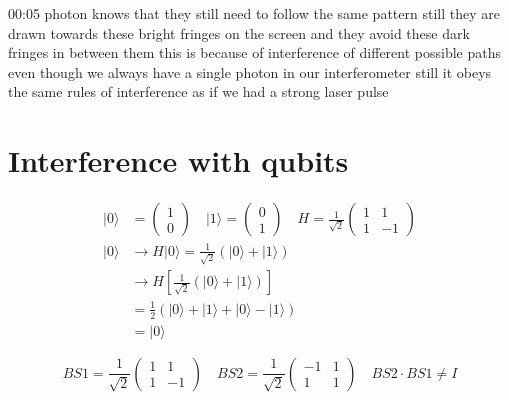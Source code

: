 00:05
photon knows that they still need to follow the same pattern still they are
drawn towards these bright fringes on the screen
and they avoid these dark fringes in between
them this is because of interference of different possible paths
even though we always have a single photon
in our interferometer still it obeys the same
rules of interference as if we had a strong laser pulse

\section{Interference with qubits}

\begin{equation}
\begin{aligned}
|0\rangle &=\left(\begin{array}{l}
1 \\
0
\end{array}\right) \quad|1\rangle=\left(\begin{array}{l}
0 \\
1
\end{array}\right) \quad H=\frac{1}{\sqrt{2}}\left(\begin{array}{cc}
1 & 1 \\
1 & -1
\end{array}\right) \\
|0\rangle & \longrightarrow H|0\rangle=\frac{1}{\sqrt{2}}(|0\rangle+|1\rangle) \\
& \longrightarrow H\left[\frac{1}{\sqrt{2}}(|0\rangle+|1\rangle)\right] \\
&=\frac{1}{2}(|0\rangle+|1\rangle+|0\rangle-|1\rangle) \\
&=|0\rangle
\end{aligned}
\end{equation}

\begin{equation}
B S 1=\frac{1}{\sqrt{2}}\left(\begin{array}{cc}
1 & 1 \\
1 & -1
\end{array}\right) \quad B S 2=\frac{1}{\sqrt{2}}\left(\begin{array}{cc}
-1 & 1 \\
1 & 1
\end{array}\right) \quad B S 2 \cdot B S 1 \neq I
\end{equation}


